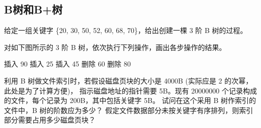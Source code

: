 \subsection{B树和B+树}

\begin{qitems}
    \begin{bbox}
        \qitem 给定一组关键字 \{20, 30, 50, 52, 60, 68, 70\}，给出创建一棵 3 阶 B 树的过程。
    \end{bbox}
    \begin{bbox}
        \qitem 对如下图所示的 3 阶 B 树，依次执行下列操作，画出各步操作的结果。
        \begin{center}
        \end{center}
        \begin{subqitems}
            \subqitem 插入 90
            \subqitem 插入 25
            \subqitem 插入 45
            \subqitem 删除 60
            \subqitem 删除 80
        \end{subqitems}
    \end{bbox}
    \begin{bbox}
        \qitem 利用 B 树做文件索引时，若假设磁盘页块的大小是 4000B (实际应是 2 的次幂，此处是为了计算方便)，
        指示磁盘地址的指针需要 5B。现有 20000000 个记录构成的文件，每个记录为 200B，其中包括关键字 5B。
        试问在这个采用 B 树作索引的文件中，B 树的阶数应为多少？
        假定文件数据部分未按关键字有序排列，则索引部分需要占用多少磁盘页块？
    \end{bbox}
\end{qitems} 